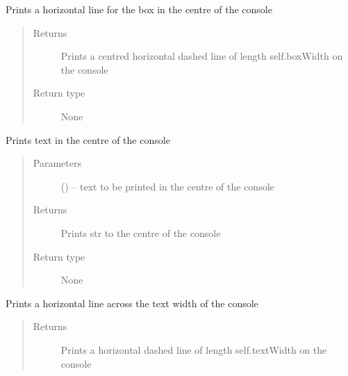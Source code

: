 \documentclass[letterpaper,10pt,english]{sphinxmanual}
\begin{document}
\begin{fulllineitems}
\begin{fulllineitems}
\label{\detokenize{MouseReferenceManual:MOUSE.SplashScreen.printBoxLine}}
Prints a horizontal line for the box in the centre of the console
\begin{quote}\begin{description}
\item[{Returns}] \leavevmode
Prints a centred horizontal dashed line of length self.boxWidth on the console

\item[{Return type}] \leavevmode
None

\end{description}\end{quote}

\end{fulllineitems}


\begin{fulllineitems}
\label{\detokenize{MouseReferenceManual:MOUSE.SplashScreen.printCentre}}
Prints text in the centre of the console
\begin{quote}\begin{description}
\item[{Parameters}] \leavevmode
{} () -- text to be printed in the centre of the console

\item[{Returns}] \leavevmode
Prints str to the centre of the console

\item[{Return type}] \leavevmode
None

\end{description}\end{quote}

\end{fulllineitems}


\begin{fulllineitems}
\label{\detokenize{MouseReferenceManual:MOUSE.SplashScreen.printFullLine}}
Prints a horizontal line across the text width of the console
\begin{quote}\begin{description}
\item[{Returns}] \leavevmode
Prints a horizontal dashed line of length self.textWidth on the console


\end{description}
\end{quote}
\end{fulllineitems}
\end{fulllineitems}
\end{document}
